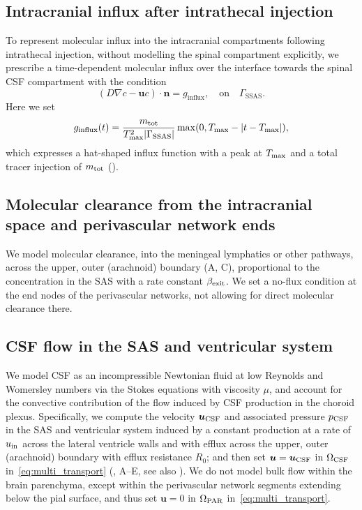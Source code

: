 \documentclass[fleqn,10pt]{wlscirep}
\begin{document}
\subsection*{Intracranial influx after intrathecal injection}
To represent molecular influx into the intracranial compartments
following intrathecal injection, without modelling the spinal
compartment explicitly, we prescribe a time-dependent molecular influx
over the interface towards the spinal CSF compartment with the condition
\begin{equation*}
  (D \nabla c - \bm u c ) \cdot \bm{n} = g_{\mathrm{influx}},  \quad \mathrm{on}  \quad \Gamma_{\mathrm{SSAS}}.
\end{equation*}
Here we set
\begin{equation*}
  g_\mathrm{influx}(t) = \frac{m_{\rm tot}}{T_{\rm max}^2 |\Gamma_{\rm SSAS}|} \max(0, T_{\rm max} - |t - T_{\rm max}|), 
\end{equation*}
which expresses a hat-shaped influx function with a peak at $T_{\rm max}$ and a total tracer injection of $m_{\rm tot}$ ().

\subsection*{Molecular clearance from the intracranial space and perivascular network ends}

We model molecular clearance, into the meningeal lymphatics or other
pathways, across the upper, outer (arachnoid) boundary
(A, C), proportional to the
concentration in the SAS with a rate constant $\beta_{\rm exit}$. We
set a no-flux condition at the end nodes of the perivascular networks,
not allowing for direct molecular clearance there.

\subsection*{CSF flow in the SAS and ventricular system}

We model CSF as an incompressible Newtonian fluid at low Reynolds and
Womersley numbers via the Stokes equations with viscosity $\mu$, and
account for the convective contribution of the flow induced by CSF
production in the choroid plexus. Specifically, we compute the
velocity $\bm u_{\rm CSF}$ and associated pressure $p_{\rm CSF}$ in
the SAS and ventricular system induced by a constant production at a
rate of $u_{\rm in}$ across the lateral ventricle walls and with
efflux across the upper, outer (arachnoid) boundary with efflux
resistance $R_0$; and then set $\bm u = \bm u_{\rm CSF}$ in
$\Omega_{\rm CSF}$ in~\eqref{eq:multi_transport}
(, A--E, see also
). We do not model bulk flow within the brain
parenchyma, except within the perivascular network segments extending
below the pial surface, and thus set $\bm u = 0$ in $\Omega_{\rm PAR}$
in~\eqref{eq:multi_transport}.
\end{document}
